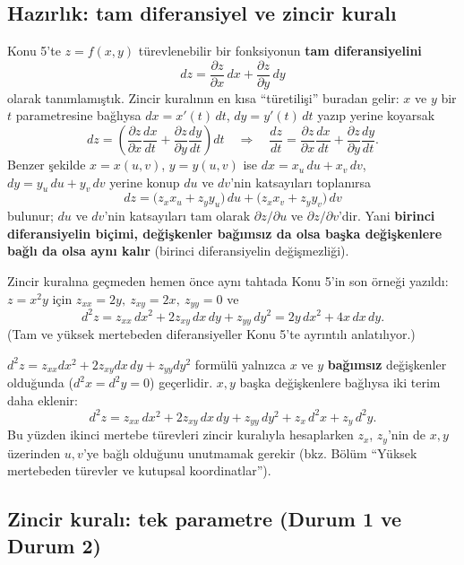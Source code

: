 \subsection{Hazırlık: tam diferansiyel ve zincir kuralı}

Konu 5'te $z=f(x,y)$ türevlenebilir bir fonksiyonun \textbf{tam diferansiyelini}
\[
dz=\frac{\partial z}{\partial x}\,dx+\frac{\partial z}{\partial y}\,dy
\]
olarak tanımlamıştık. Zincir kuralının en kısa ``türetilişi'' buradan gelir: $x$ ve $y$ bir $t$ parametresine bağlıysa
$dx=x'(t)\,dt$, $dy=y'(t)\,dt$ yazıp yerine koyarsak
\[
dz=\left(\frac{\partial z}{\partial x}\frac{dx}{dt}+\frac{\partial z}{\partial y}\frac{dy}{dt}\right)dt
\quad\Longrightarrow\quad
\frac{dz}{dt}=\frac{\partial z}{\partial x}\frac{dx}{dt}+\frac{\partial z}{\partial y}\frac{dy}{dt}.
\]
Benzer şekilde $x=x(u,v)$, $y=y(u,v)$ ise $dx=x_u\,du+x_v\,dv$, $dy=y_u\,du+y_v\,dv$ yerine konup $du$ ve $dv$'nin
katsayıları toplanırsa
\[
dz=\big(z_x x_u+z_y y_u\big)\,du+\big(z_x x_v+z_y y_v\big)\,dv
\]
bulunur; $du$ ve $dv$'nin katsayıları tam olarak $\partial z/\partial u$ ve $\partial z/\partial v$'dir. Yani
\textbf{birinci diferansiyelin biçimi, değişkenler bağımsız da olsa başka değişkenlere bağlı da olsa aynı kalır}
(birinci diferansiyelin değişmezliği).

\begin{tahta}
Zincir kuralına geçmeden hemen önce aynı tahtada Konu 5'in son örneği yazıldı:
$z=x^2y$ için $z_{xx}=2y,\ z_{xy}=2x,\ z_{yy}=0$ ve
\[
d^2z=z_{xx}\,dx^2+2z_{xy}\,dx\,dy+z_{yy}\,dy^2=2y\,dx^2+4x\,dx\,dy .
\]
(Tam ve yüksek mertebeden diferansiyeller Konu 5'te ayrıntılı anlatılıyor.)
\end{tahta}

\begin{dikkat}
$d^2z=z_{xx}dx^2+2z_{xy}dx\,dy+z_{yy}dy^2$ formülü yalnızca $x$ ve $y$ \textbf{bağımsız} değişkenler olduğunda
($d^2x=d^2y=0$) geçerlidir. $x,y$ başka değişkenlere bağlıysa iki terim daha eklenir:
\[
d^2z=z_{xx}\,dx^2+2z_{xy}\,dx\,dy+z_{yy}\,dy^2+z_x\,d^2x+z_y\,d^2y .
\]
Bu yüzden ikinci mertebe türevleri zincir kuralıyla hesaplarken $z_x$, $z_y$'nin de $x,y$ üzerinden $u,v$'ye bağlı
olduğunu unutmamak gerekir (bkz. Bölüm ``Yüksek mertebeden türevler ve kutupsal koordinatlar'').
\end{dikkat}

\subsection{Zincir kuralı: tek parametre (Durum 1 ve Durum 2)}

